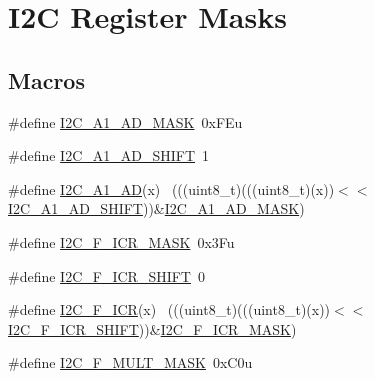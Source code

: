 \hypertarget{group___i2_c___register___masks}{}\section{I2C Register Masks}
\label{group___i2_c___register___masks}
\subsection*{Macros}
\begin{DoxyCompactItemize}
\item 
\#define \hyperlink{group___i2_c___register___masks_gad90fbd42f33b89ff3296c52700771b1b}{I2\+C\+\_\+\+A1\+\_\+\+A\+D\+\_\+\+M\+A\+SK}~0x\+F\+Eu
\item 
\#define \hyperlink{group___i2_c___register___masks_gaf074658893634b95a9858ee29bbdd88a}{I2\+C\+\_\+\+A1\+\_\+\+A\+D\+\_\+\+S\+H\+I\+FT}~1
\item 
\#define \hyperlink{group___i2_c___register___masks_ga546cc5fdf8c77c06ffefcdf0a69c1f65}{I2\+C\+\_\+\+A1\+\_\+\+AD}(x)                                                      ~(((uint8\+\_\+t)(((uint8\+\_\+t)(x))$<$$<$\hyperlink{group___i2_c___register___masks_gaf074658893634b95a9858ee29bbdd88a}{I2\+C\+\_\+\+A1\+\_\+\+A\+D\+\_\+\+S\+H\+I\+FT}))\&\hyperlink{group___i2_c___register___masks_gad90fbd42f33b89ff3296c52700771b1b}{I2\+C\+\_\+\+A1\+\_\+\+A\+D\+\_\+\+M\+A\+SK})
\item 
\#define \hyperlink{group___i2_c___register___masks_gaeb777a93b5695409902fb2f2b77eb760}{I2\+C\+\_\+\+F\+\_\+\+I\+C\+R\+\_\+\+M\+A\+SK}~0x3\+Fu
\item 
\#define \hyperlink{group___i2_c___register___masks_ga8e2daf0de75e77e33467f6b132be0c30}{I2\+C\+\_\+\+F\+\_\+\+I\+C\+R\+\_\+\+S\+H\+I\+FT}~0
\item 
\#define \hyperlink{group___i2_c___register___masks_gafc6c8fefa2930785f203c98adee6f089}{I2\+C\+\_\+\+F\+\_\+\+I\+CR}(x)                                                      ~(((uint8\+\_\+t)(((uint8\+\_\+t)(x))$<$$<$\hyperlink{group___i2_c___register___masks_ga8e2daf0de75e77e33467f6b132be0c30}{I2\+C\+\_\+\+F\+\_\+\+I\+C\+R\+\_\+\+S\+H\+I\+FT}))\&\hyperlink{group___i2_c___register___masks_gaeb777a93b5695409902fb2f2b77eb760}{I2\+C\+\_\+\+F\+\_\+\+I\+C\+R\+\_\+\+M\+A\+SK})
\item 
\#define \hyperlink{group___i2_c___register___masks_ga9e077caa9ac07c03f5e34e431d0806fa}{I2\+C\+\_\+\+F\+\_\+\+M\+U\+L\+T\+\_\+\+M\+A\+SK}~0x\+C0u
\item 

\end{DoxyCompactItemize}
